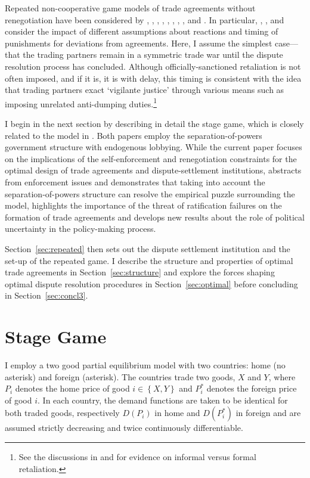 \documentclass[authoryear, review]{elsarticle}
\begin{document}
Repeated non-cooperative game models of trade agreements without renegotiation have been considered by \citet{mcm86,mcm89}, \citet{dixit1987}, \citet{bs1990, bs1997a, bs1997b, bs2002}, \citet{kovthurs}, \citet{maggi99}, \citet{ederington}, \citet{rosendorff}, \citet{bagwell2009}, and \citet{park}. In particular, \citet{hungerford}, \citet{riezman1991}, and \citet{martinvergote} consider the impact of different assumptions about reactions and timing of punishments for deviations from agreements. Here, I assume the simplest case---that the trading partners remain in a symmetric trade war until the dispute resolution process has concluded. Although officially-sanctioned retaliation is not often imposed, and if it is, it is with delay, this timing is consistent with the idea that trading partners exact `vigilante justice' through various means such as imposing unrelated anti-dumping duties.\footnote{See the discussions in \citet{bown2005} and \citet{martinvergote} for evidence on informal versus formal retaliation.}

I begin in the next section by describing in detail the stage game, which is closely related to the model in \citet{buzard2013b}. Both papers employ the separation-of-powers government structure with endogenous lobbying. While the current paper focuses on the implications of the self-enforcement and renegotiation constraints for the optimal design of trade agreements and dispute-settlement institutions, \citet{buzard2013b} abstracts from enforcement issues and demonstrates that taking into account the separation-of-powers structure can resolve the empirical puzzle surrounding the \citet{gh94} model, highlights the importance of the threat of ratification failures on the formation of trade agreements and develops new results about the role of political uncertainty in the policy-making process.

Section~\ref{sec:repeated} then sets out the dispute settlement institution and the set-up of the repeated game. I describe the structure and properties of optimal trade agreements in Section~\ref{sec:structure} and explore the forces shaping optimal dispute resolution procedures in Section~\ref{sec:optimal} before concluding in Section~\ref{sec:concl3}.


\section{Stage Game}
\label{sec:stage}
I employ a two good partial equilibrium model with two countries: home (no asterisk) and foreign (asterisk).  The countries trade two goods, $X$ and $Y$, where $P_i$ denotes the home price of good $i \in \left\{X,Y\right\}$ and $P_i^*$ denotes the foreign price of good $i$. In each country, the demand functions are taken to be identical for both traded goods, respectively $D(P_i)$ in home and $D(P_i^*)$ in foreign and are assumed strictly decreasing and twice continuously differentiable.
\end{document}
